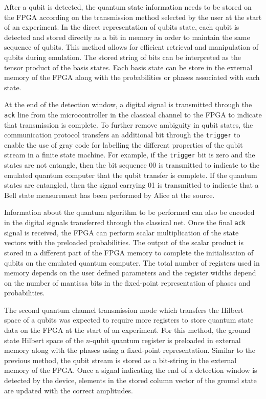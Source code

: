 After a qubit is detected, the quantum state information needs to be stored on the FPGA according on the transmission method selected by the user at the start of an experiment. In the direct representation of qubits state, each qubit is detected and stored directly as a bit in memory in order to maintain the same sequence of qubits. This method allows for efficient retrieval and manipulation of qubits during emulation. The stored string of bits can be interpreted as the tensor product of the basis states. Each basis state can be store in the external memory of the FPGA along with the probabilities or phases associated with each state. 

At the end of the detection window, a digital signal is transmitted through the \texttt{ack} line from the microcontroller in the classical channel to the FPGA to indicate that transmission is complete. To further remove ambiguity in qubit states, the communication protocol transfers an additional bit through the \texttt{trigger} to enable the use of gray code for labelling the different properties of the qubit stream in a finite state machine. For example, if the \texttt{trigger} bit is zero and the states are not entangle, then the bit sequence 00 is transmitted to indicate to the emulated quantum computer that the qubit transfer is complete. If the quantum states are entangled, then the signal carrying 01 is transmitted to indicate that a Bell state measurement has been performed by Alice at the source.

Information about the quantum algorithm to be performed can also be encoded in the digital signals transferred through the classical net. Once the final \texttt{ack} signal is received, the FPGA can perform scalar multiplication of the state vectors with the preloaded probabilities. The output of the scalar product is stored in a different part of the FPGA memory to complete the initialisation of qubits on the emulated quantum computer. The total number of registers used in memory depends on the user defined parameters and the register widths depend on the number of mantissa bits in the fixed-point representation of phases and probabilities. 

The second quantum channel transmission mode which transfers the Hilbert space of a qubits was expected to require more registers to store quantum state data on the FPGA at the start of an experiment. For this method, the ground state Hilbert space of the $n$-qubit quantum register is preloaded in external memory along with the phases using a fixed-point representation. Similar to the previous method, the qubit stream is stored as a bit-string in the external memory of the FPGA. Once a signal indicating the end of a detection window is detected by the device, elements in the stored column vector of the ground state are updated with the correct amplitudes. 

